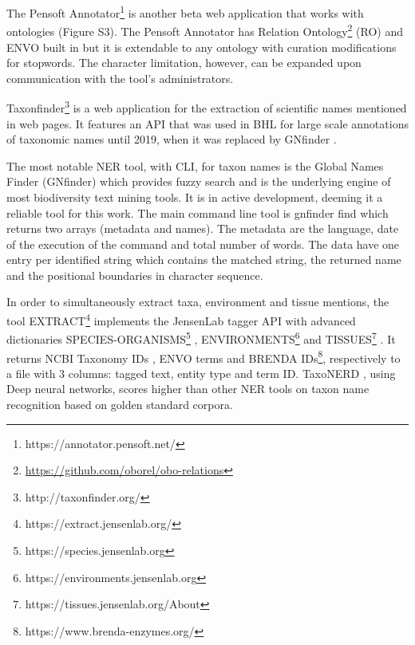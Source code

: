 The Pensoft Annotator\footnote{https://annotator.pensoft.net/} is another beta
web application that works with ontologies \citep{dimitrova_pensoft_2020}
(Figure S3). The Pensoft Annotator has Relation
Ontology\footnote{\url{https://github.com/oborel/obo-relations}} (RO) and ENVO
built in but it is extendable to any ontology with curation modifications for
stopwords. The character limitation, however, can be expanded upon
communication with the tool’s administrators.

Taxonfinder\footnote{http://taxonfinder.org/} is a web application for the
extraction of scientific names mentioned in web pages. It features an API that
was used in BHL for large scale annotations of taxonomic names until 2019,
when it was replaced by GNfinder \citep{richard_improving_2020}.

The most notable NER tool, with CLI, for taxon names is the Global Names Finder
(GNfinder) \citep{pyle_towards_2016,mozzherin_gnamesgnfinder_2022} which
provides fuzzy search and is the underlying engine of most biodiversity text
mining tools. It is in active development, deeming it a reliable tool for this
work. The main command line tool is gnfinder find which returns two arrays
(metadata and names). The metadata are the language, date of the execution of
the command and total number of words. The data have one entry per identified
string which contains the matched string, the returned name and the positional
boundaries in character sequence.

In order to simultaneously extract taxa, environment and tissue mentions, the
tool EXTRACT\footnote{https://extract.jensenlab.org/} \citep{pafilis_extract_2017}
implements the JensenLab tagger API \citep{jensen2016one} with advanced
dictionaries SPECIES-ORGANISMS\footnote{https://species.jensenlab.org} \citep{pafilis_species_2013},
ENVIRONMENTS\footnote{https://environments.jensenlab.org}
\citep{pafilis_environments_2015} and TISSUES\footnote{https://tissues.jensenlab.org/About}
\citep{palasca_tissues_2018}. It returns NCBI Taxonomy IDs \citep{schoch2020ncbi},
ENVO terms and BRENDA IDs\footnote{https://www.brenda-enzymes.org/},
respectively to a file with 3 columns: tagged text, entity type and term ID.
TaxoNERD \citep{le_guillarme_taxonerd_2022}, using Deep neural networks, scores
higher than other NER tools on taxon name recognition based on golden standard
corpora.

